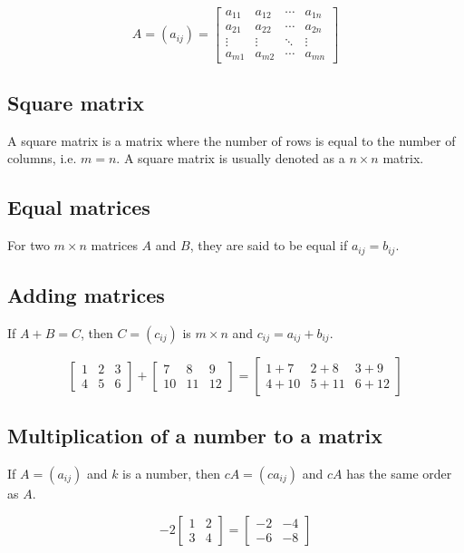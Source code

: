 \documentclass[11pt]{article}
\begin{document}
\begin{displaymath}
A = (a_{ij}) = \begin{bmatrix}
a_{11} & a_{12} & \cdots & a_{1n} \\
a_{21} & a_{22} & \cdots & a_{2n} \\
\vdots & \vdots & \ddots & \vdots \\
a_{m1} & a_{m2} & \cdots & a_{mn}
\end{bmatrix}
\end{displaymath}
\subsection{Square matrix}
\label{sec:org11c5385}
A square matrix is a matrix where the number of rows is equal to the number of columns, i.e. \(m = n\). A square matrix is usually denoted as a \(n \times n\) matrix.
\subsection{Equal matrices}
\label{sec:org9dce902}
For two \(m \times n\) matrices \(A\) and \(B\), they are said to be equal if \(a_{ij} = b_{ij}\).
\subsection{Adding matrices}
\label{sec:orgb32dd6f}
If \(A + B = C\), then \(C = (c_{ij})\) is \(m \times n\) and \(c_{ij} = a_{ij} + b_{ij}\).

\begin{displaymath}
\begin{bmatrix}
1 & 2 & 3 \\
4 & 5 & 6
\end{bmatrix} + \begin{bmatrix}
7 & 8 & 9 \\
10 & 11 & 12
\end{bmatrix} = \begin{bmatrix}
1 + 7 & 2 + 8 & 3 + 9 \\
4 + 10 & 5 + 11 & 6 + 12
\end{bmatrix}
\end{displaymath}
\subsection{Multiplication of a number to a matrix}
\label{sec:orga2e4f2d}
If \(A = (a_{ij})\) and \(k\) is a number, then \(cA = (ca_{ij})\) and \(cA\) has the same order as \(A\).

\begin{displaymath}
-2 \begin{bmatrix}
1 & 2 \\
3 & 4
\end{bmatrix} = \begin{bmatrix}
-2 & -4 \\
-6 & -8
\end{bmatrix}
\end{displaymath}
\end{document}
